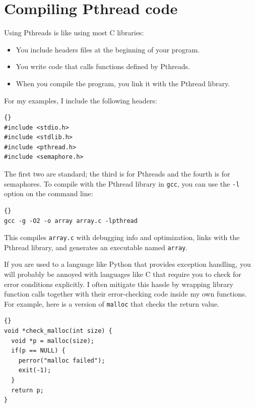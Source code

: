 \documentclass{book}
\begin{document}
\section{Compiling Pthread code}

Using Pthreads is like using most C libraries:

\begin{itemize}

    \item You include headers files at the beginning of your
          program.

    \item You write code that calls functions defined by Pthreads.

    \item When you compile the program, you link it with the
          Pthread library.

\end{itemize}

For my examples, I include the following headers:

\begin{lstlisting}[title={Headers}]{}
#include <stdio.h>
#include <stdlib.h>
#include <pthread.h>
#include <semaphore.h>
\end{lstlisting}

The first two are standard; the third is for Pthreads and
the fourth is for semaphores.
To compile with the Pthread library in {\tt gcc}, you
can use the {\tt -l}
option on the command line:

\begin{lstlisting}[title={}]{}
gcc -g -O2 -o array array.c -lpthread
\end{lstlisting}

This compiles {\tt array.c} with debugging info and optimization,
links with the Pthread library, and generates an executable
named {\tt array}.

If you are used to a language like Python that provides exception
handling, you will probably be annoyed with languages like C that
require you to check for error conditions explicitly.  I often
mitigate this hassle by wrapping library function calls
together with their error-checking code inside my own functions.
For example, here is a version of {\tt malloc}
that checks the return value.

\begin{lstlisting}[title={}]{}
void *check_malloc(int size) {
  void *p = malloc(size);
  if(p == NULL) {
    perror("malloc failed");
    exit(-1);
  }
  return p;
}
\end{lstlisting}
\end{document}

